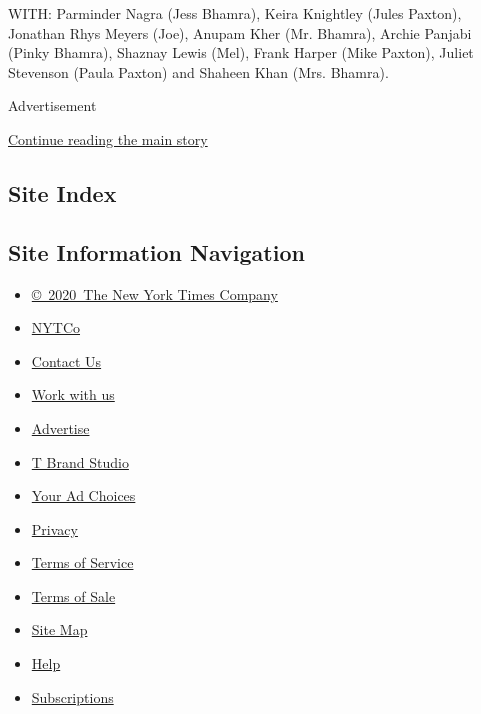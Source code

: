 WITH: Parminder Nagra (Jess Bhamra), Keira Knightley (Jules Paxton),
Jonathan Rhys Meyers (Joe), Anupam Kher (Mr. Bhamra), Archie Panjabi
(Pinky Bhamra), Shaznay Lewis (Mel), Frank Harper (Mike Paxton), Juliet
Stevenson (Paula Paxton) and Shaheen Khan (Mrs. Bhamra).

Advertisement

\protect\hyperlink{after-bottom}{Continue reading the main story}

\hypertarget{site-index}{%
\subsection{Site Index}\label{site-index}}

\hypertarget{site-information-navigation}{%
\subsection{Site Information
Navigation}\label{site-information-navigation}}

\begin{itemize}
\tightlist
\item
  \href{https://help.nytimes.com/hc/en-us/articles/115014792127-Copyright-notice}{©~2020~The
  New York Times Company}
\end{itemize}

\begin{itemize}
\tightlist
\item
  \href{https://www.nytco.com/}{NYTCo}
\item
  \href{https://help.nytimes.com/hc/en-us/articles/115015385887-Contact-Us}{Contact
  Us}
\item
  \href{https://www.nytco.com/careers/}{Work with us}
\item
  \href{https://nytmediakit.com/}{Advertise}
\item
  \href{http://www.tbrandstudio.com/}{T Brand Studio}
\item
  \href{https://www.nytimes.com/privacy/cookie-policy\#how-do-i-manage-trackers}{Your
  Ad Choices}
\item
  \href{https://www.nytimes.com/privacy}{Privacy}
\item
  \href{https://help.nytimes.com/hc/en-us/articles/115014893428-Terms-of-service}{Terms
  of Service}
\item
  \href{https://help.nytimes.com/hc/en-us/articles/115014893968-Terms-of-sale}{Terms
  of Sale}
\item
  \href{https://spiderbites.nytimes.com}{Site Map}
\item
  \href{https://help.nytimes.com/hc/en-us}{Help}
\item
  \href{https://www.nytimes.com/subscription?campaignId=37WXW}{Subscriptions}
\end{itemize}
